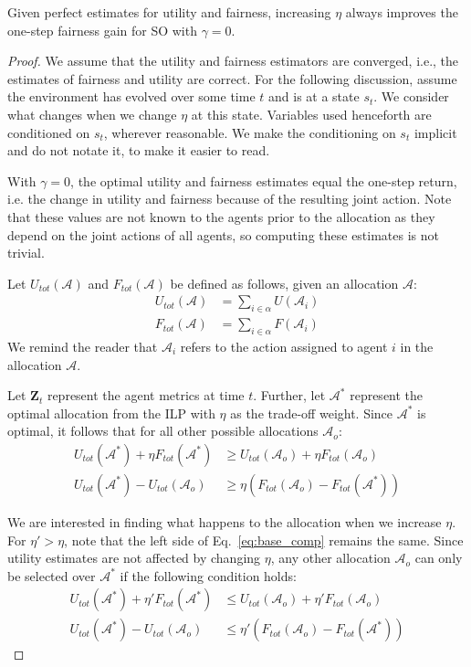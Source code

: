 \setcounter{theorem}{0}
\begin{theorem}
Given perfect estimates for utility and fairness, increasing $\eta$ always improves the one-step fairness gain for SO with $\gamma=0$.
\label{th:theorem_fair_app}
\end{theorem}
\begin{proof}
We assume that the utility and fairness estimators are converged, i.e., the estimates of fairness and utility are correct. For the following discussion, assume the environment has evolved over some time $t$ and is at a state $s_t$. We consider what changes when we change $\eta$ at this state. Variables used henceforth are conditioned on $s_t$, wherever reasonable. We make the conditioning on $s_t$ implicit and do not notate it, to make it easier to read.

With $\gamma=0$, the optimal utility and fairness estimates equal the one-step return, i.e. the change in utility and fairness because of the resulting joint action. Note that these values are not known to the agents prior to the allocation as they depend on the joint actions of all agents, so computing these estimates is not trivial.

Let $U_{tot}(\mathcal{A})$ and $F_{tot}(\mathcal{A})$ be defined as follows, given an allocation $\mathcal{A}$:
\begin{align}
    U_{tot}(\mathcal{A}) &= \sum_{i\in\alpha}U(\mathcal{A}_i)\\
    F_{tot}(\mathcal{A}) &= \sum_{i\in\alpha}F(\mathcal{A}_i)
\end{align}
We remind the reader that $\mathcal{A}_i$ refers to the action assigned to agent $i$ in the allocation $\mathcal{A}$.

Let $\textbf{Z}_t$ represent the agent metrics at time $t$. Further, let $\mathcal{A}^*$ represent the optimal allocation from the ILP with $\eta$ as the trade-off weight. Since $\mathcal{A}^*$ is optimal, it follows that for all other possible allocations $\mathcal{A}_o$: 
\begin{align}
    U_{tot}(\mathcal{A}^*) + \eta F_{tot}(\mathcal{A}^*) &\ge U_{tot}(\mathcal{A}_o) + \eta F_{tot}(\mathcal{A}_o)  \\
    U_{tot}(\mathcal{A}^*) - U_{tot}(\mathcal{A}_o)&\ge  \eta (F_{tot}(\mathcal{A}_o) - F_{tot}(\mathcal{A}^*)) \label{eq:base_comp} 
\end{align}

We are interested in finding what happens to the allocation when we increase $\eta$.
For $\eta'>\eta$, note that the left side of Eq.~\ref{eq:base_comp} remains the same. Since utility estimates are not affected by changing $\eta$, any other allocation $\mathcal{A}_o$ can only be selected over $\mathcal{A}^*$ if the following condition holds:
\begin{align}
    U_{tot}(\mathcal{A}^*) + \eta' F_{tot}(\mathcal{A}^*) &\le U_{tot}(\mathcal{A}_o) + \eta' F_{tot}(\mathcal{A}_o)  \\
    U_{tot}(\mathcal{A}^*) - U_{tot}(\mathcal{A}_o)&\le  \eta' (F_{tot}(\mathcal{A}_o) - F_{tot}(\mathcal{A}^*)) \label{eq:base_comp2} 
\end{align}


\end{proof}
